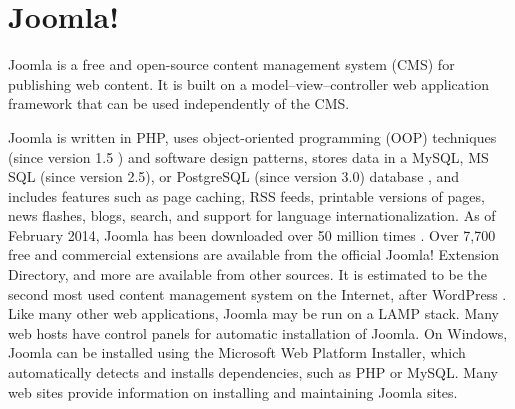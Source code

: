 \section{Joomla!}
\label{sec:CMS_joomla}

Joomla is a free and open-source content management system (CMS) for publishing web content. It is built on a model–view–controller web application framework that can be used independently of the CMS. \cite{cms_joomla_overview}

Joomla is written in PHP, uses object-oriented programming (OOP) techniques (since version 1.5  \cite{cms_joomla_mvc}) and software design patterns, stores data in a MySQL, MS SQL (since version 2.5), or PostgreSQL (since version 3.0) database \cite{cms_joomla_2.5}, and includes features such as page caching, RSS feeds, printable versions of pages, news flashes, blogs, search, and support for language internationalization.
As of February 2014, Joomla has been downloaded over 50 million times \cite{cms_joomla_stats}. Over 7,700 free and commercial extensions are available from the official Joomla! Extension Directory, and more are available from other sources. It is estimated to be the second most used content management system on the Internet, after WordPress \cite{cms_stats}. 
Like many other web applications, Joomla may be run on a LAMP stack.
Many web hosts have control panels for automatic installation of Joomla. On Windows, Joomla can be installed using the Microsoft Web Platform Installer, which automatically detects and installs dependencies, such as PHP or MySQL.
Many web sites provide information on installing and maintaining Joomla sites.

